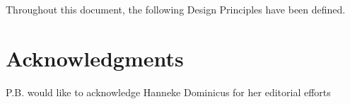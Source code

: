 \documentclass[sort&compress,preprint,authoryear,3p,twocolumn]{elsarticle}
\begin{document}
\onecolumn

Throughout this document, the following Design Principles have been defined. 


\twocolumn


\section*{Acknowledgments}
P.B. would like to acknowledge Hanneke Dominicus for her editorial
efforts



\end{document}
